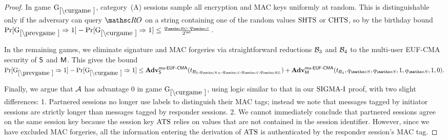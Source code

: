\begin{proof}
	In game $\curGm$, category~(A) sessions sample all encryption and MAC keys uniformly at random. This is distinguishable only if the adversary can query $\RO$ on a string containing one of the random values $\mathrm{SHTS}$ or $\mathrm{CHTS}$, so by the birthday bound
	$\Pr[\prevGm*\Rightarrow 1 ] - \Pr[\curGm*\Rightarrow 1] \leq \frac{\qRO\cdot \qSend}{2^{\kl}}$.
	
	In the remaining games, we eliminate signature and MAC forgeries via straightforward reductions $\mathcal{B}_3$ and $\mathcal{B}_4$ to the multi-user EUF-CMA security of $\mathsf{S}$ and $\mathsf{M}$. This gives the bound 
	$
	\Pr[\prevGm*\Rightarrow 1 ] - \Pr[\curGm*\Rightarrow 1] \leq
	\Adv^{\muEUFCMA}_{\SIGScheme}(t_{\advB_3\cab \qNew\cab \qSend\cab \qSend\cab \qRevLongTermKey})
	+ \Adv^{\muEUFCMA}_{\MACScheme}(t_{\advB_4}\cab \qSend\cab \qSend\cab 1\cab \qSend\cab 1\cab 0).
	$
	
	Finally, we argue that $\mathcal{A}$ has advantage $0$ in game $\curGm$, using logic similar to that in our $\mbox{SIGMA-I}$ proof, with two slight differences: 1. Partnered sessions no longer use labels to distinguish their MAC tags; instead we note that  messages tagged by initiator sessions are strictly longer than messages tagged by responder sessions. 2. We cannot immediately conclude that partnered sessions agree on the same session key because the session key $\mathrm{ATS}$ relies on values that are not contained in the session identifier. However, since we have excluded MAC forgeries, all the information entering the derivation of $\mathrm{ATS}$ is authenticated by the responder session's MAC tag.
\end{proof}

\fi

